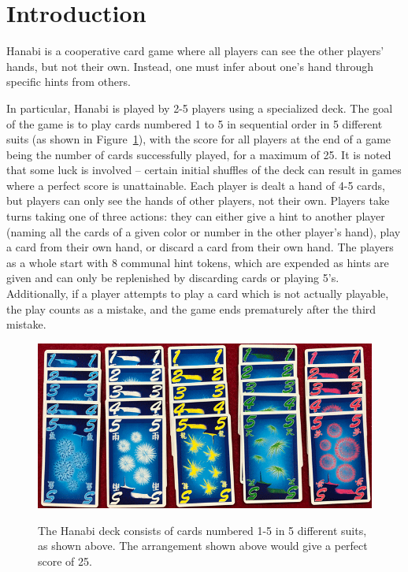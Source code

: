 \documentclass{article}
\begin{document}
\section{Introduction}

Hanabi is a cooperative card game where all players can see the other players' hands, but not their own. Instead, one must infer about one's hand through specific hints from others.

In particular, Hanabi is played by 2-5 players using a specialized deck. The goal of the game is to play cards numbered 1 to 5 in sequential order in 5 different suits (as shown in Figure~\ref{fig:cards}), with the score for all players at the end of a game being the number of cards successfully played, for a maximum of 25. It is noted that some luck is involved -- certain initial shuffles of the deck can result in games where a perfect score is unattainable. Each player is dealt a hand of 4-5 cards, but players can only see the hands of other players, not their own. Players take turns taking one of three actions: they can either give a hint to another player (naming all the cards of a given color or number in the other player's hand), play a card from their own hand, or discard a card from their own hand. The players as a whole start with 8 communal hint tokens, which are expended as hints are given and can only be replenished by discarding cards or playing 5’s. Additionally, if a player attempts to play a card which is not actually playable, the play counts as a mistake, and the game ends prematurely after the third mistake.

\begin{figure}
  \includegraphics[width=\columnwidth]{cards}
  \label{fig:cards}
  \caption{The Hanabi deck consists of cards numbered 1-5 in 5 different suits, as shown above. The arrangement shown above would give a perfect score of 25.}
\end{figure}
\end{document}
